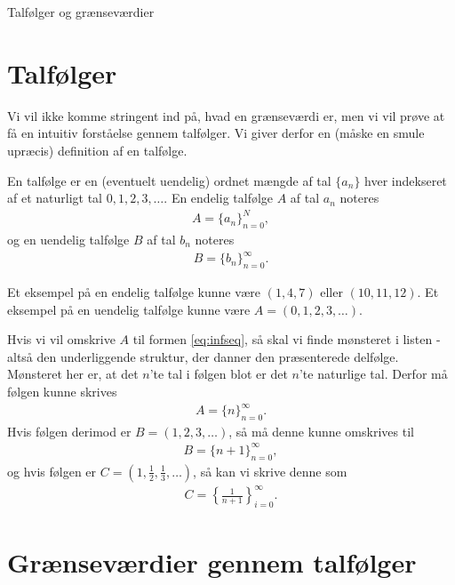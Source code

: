 
\begin{center}
\Huge
Talfølger og grænseværdier
\end{center}
\section*{Talfølger}
Vi vil ikke komme stringent ind på, hvad en grænseværdi er, men vi vil prøve at få en intuitiv forståelse gennem talfølger. Vi giver derfor en (måske en smule upræcis) definition af en talfølge.
\begin{defn}[Talfølge]
En talfølge er en (eventuelt uendelig) ordnet mængde af tal $\{a_n\}$ hver indekseret af et naturligt tal $0,1,2,3,\hdots$. En endelig talfølge $A$ af tal $a_n$ noteres 
\begin{align}
A = \{a_n\}_{n=0}^N,
\end{align}
og en uendelig talfølge $B$ af tal $b_n$ noteres
\begin{align}\label{eq:infseq}
B = \{b_n\}_{n=0}^\infty.
\end{align}
\end{defn}
\begin{exa}
Et eksempel på en endelig talfølge kunne være $(1,4,7)$ eller $(10,11,12)$. Et eksempel på en uendelig talfølge kunne være $A= (0,1,2,3,\hdots)$. 

Hvis vi vil omskrive $A$ til formen \eqref{eq:infseq}, så skal vi finde mønsteret i listen - altså den underliggende struktur, der danner den præsenterede delfølge. Mønsteret her er, at det $n$'te tal i følgen blot er det $n$'te naturlige tal. Derfor må følgen kunne skrives
\begin{align*}
A = \{n\}_{n=0}^\infty.
\end{align*}
Hvis følgen derimod er $B = (1,2,3,\hdots)$, så må denne kunne omskrives til
\begin{align*}
B = \{n+1\}_{n=0}^\infty,
\end{align*}
og hvis følgen er $C= (1,\frac{1}{2},\frac{1}{3},\hdots)$, så kan vi skrive denne som
\begin{align*}
C = \left\{ \frac{1}{n+1}\right\}_{i=0}^\infty.
\end{align*}
\end{exa}
\section*{Grænseværdier gennem talfølger}

